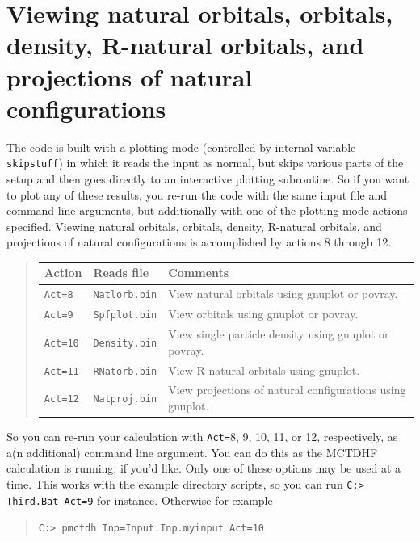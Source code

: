 \documentclass[10pt,leqno, oneside]{book}
\begin{document}
\section{Viewing natural orbitals, orbitals, density, R-natural orbitals, and projections of natural configurations \label{viewsect}}

The code is built with a plotting mode (controlled by internal variable \verb#skipstuff#) in which it reads the input as normal, but skips various parts of the setup and then goes directly to an interactive plotting subroutine.   So if you want to plot any of these results, you re-run the code with the same input file and command line arguments, but additionally with one of the plotting mode actions specified.  Viewing natural orbitals, orbitals, density, R-natural orbitals, and projections of natural configurations is accomplished by actions 8 through 12.  
\begin{quote}
\begin{tabular}{lll}
Action & Reads file & Comments \\
\hline
\verb#Act=8# & \verb#Natlorb.bin# & View natural orbitals using gnuplot or povray. \\
\verb#Act=9# & \verb#Spfplot.bin# & View orbitals using gnuplot or povray. \\
\verb#Act=10# & \verb#Density.bin# & View single particle density using gnuplot or povray. \\
\verb#Act=11# & \verb#RNatorb.bin# & View R-natural orbitals using gnuplot. \\
\verb#Act=12# & \verb#Natproj.bin# & View projections of natural configurations using gnuplot. \\
\end{tabular}
\end{quote}
So you can re-run your calculation with \verb#Act=#8, 9, 10, 11, or 12, respectively, as a(n additional) command line argument.  You can do this as the MCTDHF calculation is running, if you'd like.  Only one of these options may be used at a time.  This works with the example directory scripts, so you can run \verb#C:> Third.Bat Act=9# for instance.  Otherwise for example
\begin{quote}
\verb#C:> pmctdh Inp=Input.Inp.myinput Act=10#
\end{quote}
\end{document}
